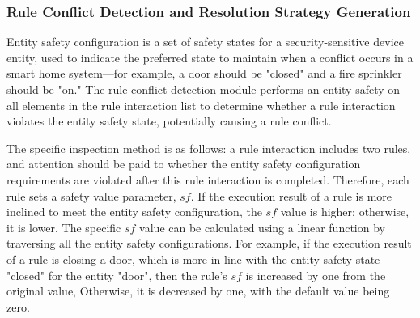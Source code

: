 \subsubsection{Rule Conflict Detection and Resolution Strategy Generation}
Entity safety configuration is a set of safety states for a security-sensitive device entity, used to indicate the preferred state to maintain when a conflict occurs in a smart home system—for example, a door should be "closed" and a fire sprinkler should be "on." The rule conflict detection module performs an entity safety on all elements in the rule interaction list to determine whether a rule interaction violates the entity safety state, potentially causing a rule conflict.

The specific inspection method is as follows: a rule interaction includes two rules, and attention should be paid to whether the entity safety configuration requirements are violated after this rule interaction is completed. Therefore, each rule sets a safety value parameter, $sf$. If the execution result of a rule is more inclined to meet the entity safety configuration, the $sf$ value is higher; otherwise, it is lower. The specific $sf$ value can be calculated using a linear function by traversing all the entity safety configurations. For example, if the execution result of a rule is closing a door, which is more in line with the entity safety state "closed" for the entity "door", then the rule's $sf$ is increased by one from the original value, Otherwise, it is decreased by one, with the default value being zero.

